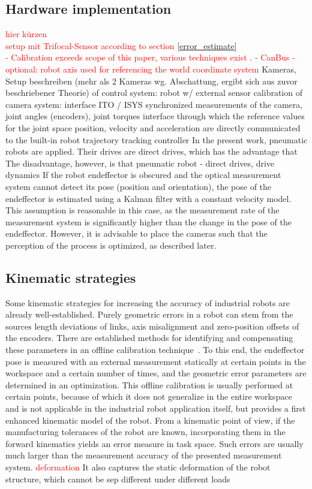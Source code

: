 \documentclass[5p,times,procedia]{elsarticle}
\begin{document}
\subsection{Hardware implementation}
%
\textcolor{red}{hier kürzen \\
setup mit Trifocal-Sensor according to section \ref{error_estimate}\\
- Calibration exceeds scope of this paper, various techniques exist \cite{Hartley2018}.
- CanBus
- optional: robot axis used for referencing the world coordinate system
}
%
Kameras, Setup beschreiben (mehr als 2 Kameras wg. Abschattung, ergibt sich aus zuvor beschriebener Theorie)
%
%
of control system: robot w/ external sensor
calibration of camera system: interface ITO / ISYS
synchronized measurements of the camera, joint angles (encoders), joint torques 
interface through which the reference values for the joint space position, velocity and acceleration are directly communicated to the built-in robot trajectory tracking controller
%
In the present work, pneumatic robots are applied. 
%
Their drives are direct drives, which has the advantage that
%
%
The disadvantage, however, is that 
pneumatic robot - direct drives, drive dynamics 
%
If the robot endeffector is obscured and the optical measurement system cannot detect its pose (position and orientation), the pose of the endeffector is estimated using a Kalman filter with a constant velocity model. This assumption is reasonable in this case, as the measurement rate of the measurement system is significantly higher than the change in the pose of the endeffector.
However, it is advisable to place the cameras such that the perception of the process is optimized, as described later.
%
%
\subsection{Kinematic strategies}
Some kinematic strategies for increasing the accuracy of industrial robots are already well-established.
Purely geometric errors in a robot can stem from the sources length deviations of links, axis misalignment and zero-position offsets of the encoders.
There are established methods for identifying and compensating these parameters in an offline calibration technique~\cite{Wiest01}.
To this end, the endeffector pose is measured with an external measurement statically at certain points in the workspace and a certain number of times, and the geometric error parameters are determined in an optimization.
This offline calibration is usually performed at certain points, because of which it does not generalize in the entire workspace and is not applicable in the industrial robot application itself, but provides a first enhanced kinematic model of the robot.
From a kinematic point of view, if the manufacturing tolerances of the robot are known, incorporating them in the forward kinematics yields an error measure in task space. Such errors are usually much larger than the measurement accuracy of the presented measurement system.
%
\textcolor{red}{deformation}
It also captures the static deformation of the robot structure, which cannot be sep
different under different loads 
%
\end{document}
